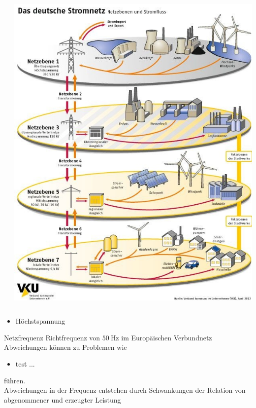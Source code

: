\documentclass[aspectratio=1610, professionalfonts, 9pt]{beamer}
\begin{document}
\begin{frame}
  \begin{columns}
  \begin{column}{0.6\textwidth}
\end{column}
\begin{column}{0.4\textwidth}
\includegraphics[width=1\textwidth]{images/netzebenen.jpg}
\end{column}
\end{columns}
  \begin{itemize}
    \item Höchstspannung
  \end{itemize}
\end{frame}


\begin{frame}{Netzfrequenz}
Richtfrequenz von $\SI{50}{\hertz}$ im Europäischen Verbundnetz
Abweichungen können zu Problemen wie
\begin{itemize}
  \item test ...
\end{itemize}
führen.\\
Abweichungen in der Frequenz entstehen durch Schwankungen der Relation von abgenommener und erzeugter Leistung

\end{frame}
\end{document}
